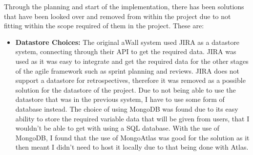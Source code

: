 \documentclass[11pt
              , a4paper
              , twoside
              , openright
              ]{report}
\begin{document}
Through the planning and start of the implementation, there has been solutions that have been looked over and removed from within the project due to not fitting within the scope required of them in the project. These are:


\begin{itemize}
	\item
\textbf{Datastore Choices:} The original aWall system used JIRA as a datastore system, connecting through their API to get the required data. JIRA was used as it was easy to integrate and get the required data for the other stages of the agile framework such as sprint planning and reviews. JIRA does not support a datastore for retrospectives, therefore it was removed as a possible solution for the datastore of the project. Due to not being able to use the datastore that was in the previous system, I have to use some form of database instead. The choice of using MongoDB was found due to its easy ability to store the required variable data that will be given from users, that I wouldn't be able to get with using a SQL database. With the use of MongoDB, I found that the use of MongoAtlas was good for the solution as it then meant I didn't need to host it locally due to that being done with Atlas. 
\end{itemize}
\end{document}

